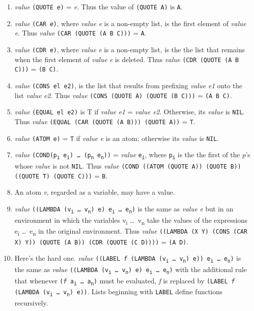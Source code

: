 \documentclass[10pt,a4paper,twocolumn]{article}
\newcommand{\args}[1] {#1\textsubscript{i} \dots \ #1\textsubscript{n}}
\newcommand{\ei}[0] {e\textsubscript{i}}
\newcommand{\en}[0] {e\textsubscript{n}}
\begin{document}
\begin{enumerate}

\item \textit{value} \texttt{(QUOTE \textit{e})} = \textit{e}. Thus the value of
  \texttt{(QUOTE A)} is \texttt{A}.

\item \textit{value} \texttt{(CAR \textit{e})}, where \textit{value e} is a
  non-empty list, is the first element of \textit{value e}. Thus \textit{value}
  \texttt{(CAR (QUOTE (A B C)))} = \texttt{A}.

\item \textit{value} \texttt{(CDR e)}, where \textit{value} \textit{e} is a
  non-empty list, is the the list that remains when the first element of
  \textit{value} \textit{e} is deleted. Thus \textit{value} \texttt{(CDR (QUOTE
    (A B C)))} = \texttt{(B C)}.

\item \textit{value} \texttt{(CONS el e2)}, is the list that results from
  prefixing \textit{value e1} onto the list \textit{value e2}. Thus
  \textit{value} \texttt{(CONS (QUOTE A) (QUOTE (B C)))} = \texttt{(A B C)}.

\item \textit{value} \texttt{(EQUAL el e2)} is T if \textit{value e1} =
  \textit{value e2}. Otherwise, its \textit{value} is \texttt{NIL}. Thus
  \textit{value} \texttt{(EQUAL (CAR (QUOTE (A B))) (QUOTE A))} = \texttt{T}.

\item \textit{value} \texttt{(ATOM e)} = \texttt{T} if \textit{value e} is an atom;
  otherwise its \textit{value} is \texttt{NIL}.

\item \textit{value} \texttt{(COND(p\textsubscript{i} \ei) \dots
    (p\textsubscript{n} \en))} = \textit{value}
  \texttt{\ei}, where \texttt{p\textsubscript{i}} is the the
  first of the \textit{p}\rq s whose \textit{value} is not \texttt{NIL}. Thus
  \textit{value} \texttt{(COND ((ATOM (QUOTE A)) (QUOTE B)) ((QUOTE T) (QUOTE
    C)))} = \texttt{B}.

\item An atom \textit{v}, regarded as a variable, may have a value.

\item \textit{value} \texttt{((LAMBDA (\args{v}) e) \args{e})} is the same as
  \textit{value e} but in an environment in which the variables \args{v} take
  the values of the expressions \args{e} in the original environment. Thus
  \textit{value} \texttt{((LAMBDA (X Y) (CONS (CAR X) Y)) (QUOTE (A B)) (CDR
    (QUOTE (C D))))} = \texttt{(A D)}.

\item Here\rq s the hard one. \textit{value} \texttt{((LABEL \textit{f} (LAMBDA
    (\args{v}) e)) \args{e})} is the same as \textit{value} \texttt{((LAMBDA
    (\args{v}) e) \args{e})} with the additional rule that whenever
  \texttt{(\textit{f} \args{a})} must be evaluated, \textit{f} is replaced by
  \texttt{(LABEL \textit{f} (LAMBDA (\args{v}) e))}. Lists beginning with \texttt{LABEL}
  define functions recursively.

\end{enumerate}
\end{document}
